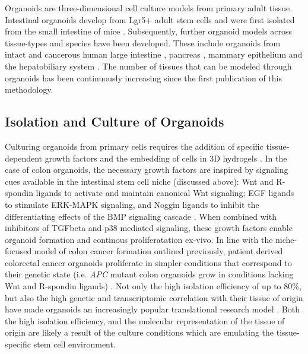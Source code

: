 \begin{flushleft}
Organoids are three-dimensional cell culture models from primary adult tissue. Intestinal organoids develop from Lgr5+ adult stem cells and were first isolated from the small intestine of mice \parencite{satoSingleLgr5Stem2009}. Subsequently, further organoid models across tissue-types and species have been developed. These include organoids from intact and cancerous human large intestine \parencite{satoLongtermExpansionEpithelial2011}, pancreas \parencite{driehuisPancreaticCancerOrganoids2019}, mammary epithelium \parencite{zhangEstablishingEstrogenresponsiveMouse2017, sachsLivingBiobankBreast2018} and the hepatobiliary system \parencite{huchVitroExpansionSingle2013}. The number of tissues that can be modeled through organoids has been continuously increasing since the first publication of this methodology.

\subsection{Isolation and Culture of Organoids}

Culturing organoids from primary cells requires the addition of specific tissue-dependent growth factors and the embedding of cells in 3D hydrogels \parencite{merkerGastrointestinalOrganoidsHow2016}. In the case of colon organoids, the necessary growth factors are inspired by signaling cues available in the intestinal stem cell niche (discussed above): Wnt and R-spondin ligands to activate and maintain canonical Wnt signaling; EGF ligands to stimulate ERK-MAPK signaling, and Noggin ligands to inhibit the differentiating effects of the BMP signaling cascade \parencite{satoGrowingSelforganizingMiniguts2013}. When combined with inhibitors of TGFbeta and p38 mediated signaling, these growth factors enable organoid formation and continous proliferatation ex-vivo. In line with the niche-focused model of colon cancer formation outlined previously, patient derived colorectal cancer organoids proliferate in simpler conditions that correspond to their genetic state (i.e. \textit{APC} mutant colon organoids grow in conditions lacking Wnt and R-spondin ligands) \parencite{Fujii2016-ax}. Not only the high isolation efficiency of up to 80\%, but also the high genetic and transcriptomic correlation with their tissue of origin have made organoids an increasingly popular translational research model \parencite{pauliPersonalizedVitroVivo2017a}. Both the high isolation efficiency, and the molecular representation of the tissue of origin are likely a result of the culture conditions which are emulating the tissue-specific stem cell environment. \par


\end{flushleft}
